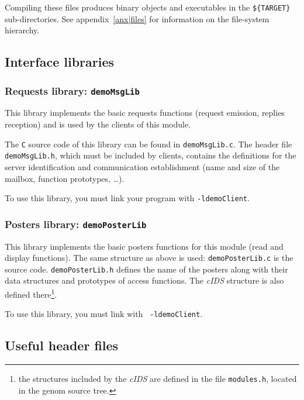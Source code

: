 Compiling these files produces binary objects and executables in the 
\texttt{\$\{TARGET\}} sub-\-directories. See appendix~\ref{anx|files} for
information on the file-system hierarchy.

\subsection{Interface libraries}

\subsubsection{Requests library: \texttt{demoMsgLib}}

This library implements  the basic requests  functions (request emission,
replies reception) and is used by the clients of this module.

The \texttt{C}  source code    of  this  library  can be   found  in  
\texttt{demoMsgLib.c}.  The header
file \texttt{demoMsgLib.h}, which must  be included by clients, contains the
definitions for the server identification and communication establishment
(name and size of the mailbox, function prototypes, \ldots).

To use this  library, you must link your  program with  
\texttt{-ldemoClient}. 


\subsubsection{Posters library: \texttt{demoPosterLib}}

This library implements the basic posters functions for this module (read
and display   functions).  The same    structure as above  is used:  
\texttt{demoPosterLib.c} is  the  source code. 
\texttt{demoPosterLib.h}   defines the name  of  the
posters along  with  their data structures and prototypes of access
functions.
The  \emph{cIDS} structure is
also defined there\footnote{the structures included by the \emph{cIDS} are
defined in the file \texttt{modules.h}, located in the genom source tree.}.

To  use this library,  you must link  with  \texttt{
-ldemoClient}.


\subsection{Useful header files}

